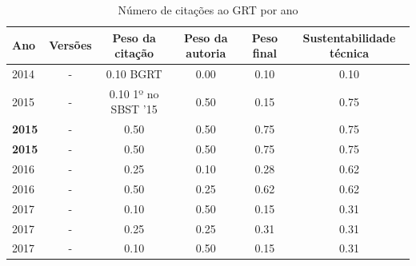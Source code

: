 \begin{table}[H]
\caption{Número de citações ao GRT  por ano}
\centering
\begin{tabular}{| l | c | c | c | c | c |}
  \hline
  Ano & Versões & Peso da citação & Peso da autoria & Peso final & Sustentabilidade técnica \\
  \hline
            2014
          &
          -
          &
          0.10
            {\tiny BGRT}
          &
          0.00
          &
          0.10
          &
            {\color{red} 0.10}
          \\
\hline
            2015
          &
          -
          &
          0.10
            {\tiny 1º no SBST '15}
          &
          0.50
          &
          0.15
          &
            {\color{blue} 0.75}
          \\
            {\bf 2015}
          &
          -
          &
          0.50
          &
          0.50
          &
          0.75
          &
            {\color{blue} 0.75}
          \\
            {\bf 2015}
          &
          -
          &
          0.50
          &
          0.50
          &
          0.75
          &
            {\color{blue} 0.75}
          \\
\hline
            2016
          &
          -
          &
          0.25
          &
          0.10
          &
          0.28
          &
            {\color{blue} 0.62}
          \\
            2016
          &
          -
          &
          0.50
          &
          0.25
          &
          0.62
          &
            {\color{blue} 0.62}
          \\
\hline
            2017
          &
          -
          &
          0.10
          &
          0.50
          &
          0.15
          &
            {\color{red} 0.31}
          \\
            2017
          &
          -
          &
          0.25
          &
          0.25
          &
          0.31
          &
            {\color{red} 0.31}
          \\
            2017
          &
          -
          &
          0.10
          &
          0.50
          &
          0.15
          &
            {\color{red} 0.31}
          \\
\hline
\end{tabular}
\end{table}



